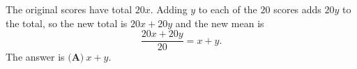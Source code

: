 The original scores have total $20x$. Adding $y$ to each of the $20$ scores adds $20y$ to the total, so the new total is $20x+20y$ and the new mean is
\[
\dfrac{20x+20y}{20}=x+y .
\]
The answer is $\boxed{\textbf{(A)}\ x+y}$.
